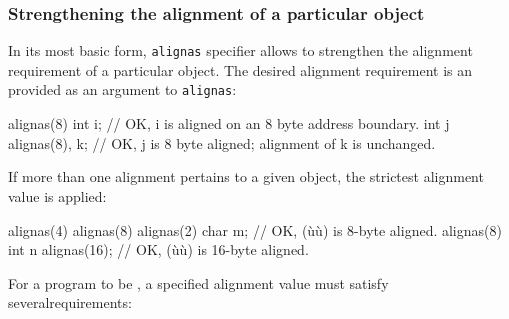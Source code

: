 \subsubsection[Strengthening the alignment of a particular object]{Strengthening the alignment of a particular object}\label{restricting-the-alignment-of-a-particular-object}\label{strengthening-the-alignment-of-a-particular-object}

In its most basic form, \lstinline!alignas! specifier allows to strengthen the alignment requirement of a particular object. The desired alignment requirement is an  provided as an argument to \lstinline!alignas!:

\begin{emcppslisting}
alignas(8) int i;   // OK, i is aligned on an 8 byte address boundary.
int j alignas(8), k; // OK, j is 8 byte aligned; alignment of k is unchanged.
\end{emcppslisting}

\noindent If more than one alignment pertains to a given object, the strictest alignment value is applied:

\begin{emcppslisting}
alignas(4) alignas(8) alignas(2) char m;  // OK, (ù{}ù) is 8-byte aligned.
alignas(8) int n alignas(16);             // OK, (ù{}ù) is 16-byte aligned.
\end{emcppslisting}

\noindent For a program to be , a specified alignment value
must satisfy several\linebreak[4] \mbox{requirements}:

